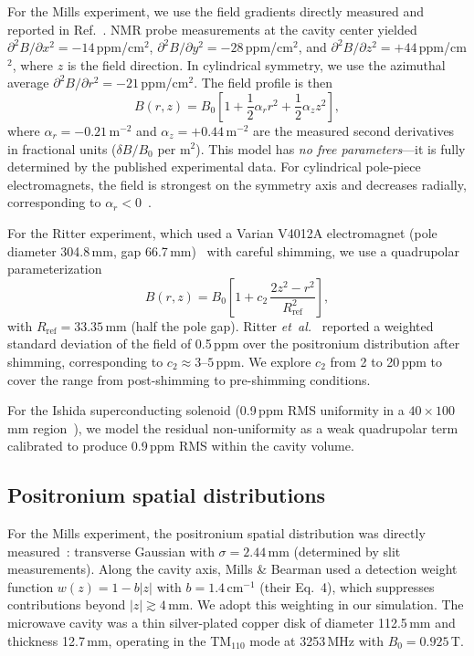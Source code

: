 \documentclass[twocolumn,pra,aps,superscriptaddress,floatfix,10pt]{revtex4-2}
\begin{document}
For the Mills experiment, we use the field gradients directly measured and reported in Ref.~\cite{Mills1975}. NMR probe measurements at the cavity center yielded $\partial^2 B/\partial x^2 = -14$\,ppm/cm$^2$, $\partial^2 B/\partial y^2 = -28$\,ppm/cm$^2$, and $\partial^2 B/\partial z^2 = +44$\,ppm/cm$^2$, where $z$ is the field direction. In cylindrical symmetry, we use the azimuthal average $\partial^2 B/\partial r^2 = -21$\,ppm/cm$^2$. The field profile is then
\begin{equation}
  B(r,z) = B_0\left[1 + \frac{1}{2}\alpha_r r^2 + \frac{1}{2}\alpha_z z^2\right],
  \label{eq:mills_field}
\end{equation}
where $\alpha_r = -0.21$\,m$^{-2}$ and $\alpha_z = +0.44$\,m$^{-2}$ are the measured second derivatives in fractional units ($\delta B / B_0$ per m$^2$). This model has \emph{no free parameters}---it is fully determined by the published experimental data. For cylindrical pole-piece electromagnets, the field is strongest on the symmetry axis and decreases radially, corresponding to $\alpha_r < 0$~\cite{Rich1981}.

For the Ritter experiment, which used a Varian V4012A electromagnet (pole diameter 304.8\,mm, gap 66.7\,mm)~\cite{Theriot1970,Ritter1984} with careful shimming, we use a quadrupolar parameterization
\begin{equation}
  B(r,z) = B_0\left[1 + c_2\,\frac{2z^2 - r^2}{R_\mathrm{ref}^2}\right],
  \label{eq:ritter_field}
\end{equation}
with $R_\mathrm{ref} = 33.35$\,mm (half the pole gap). Ritter \textit{et~al.}~\cite{Ritter1984} reported a weighted standard deviation of the field of 0.5\,ppm over the positronium distribution after shimming, corresponding to $c_2 \approx 3$--$5$\,ppm. We explore $c_2$ from 2 to 20\,ppm to cover the range from post-shimming to pre-shimming conditions.

For the Ishida superconducting solenoid (0.9\,ppm RMS uniformity in a $40 \times 100$\,mm region~\cite{Ishida2014}), we model the residual non-uniformity as a weak quadrupolar term calibrated to produce 0.9\,ppm RMS within the cavity volume.

\subsection{Positronium spatial distributions}
\label{sec:ps_dist}

For the Mills experiment, the positronium spatial distribution was directly measured~\cite{Mills1975}: transverse Gaussian with $\sigma = 2.44$\,mm (determined by slit measurements). Along the cavity axis, Mills \& Bearman used a detection weight function $w(z) = 1 - b|z|$ with $b = 1.4$\,cm$^{-1}$ (their Eq.~4), which suppresses contributions beyond $|z| \gtrsim 4$\,mm. We adopt this weighting in our simulation. The microwave cavity was a thin silver-plated copper disk of diameter 112.5\,mm and thickness 12.7\,mm, operating in the TM$_{110}$ mode at 3253\,MHz with $B_0 = 0.925$\,T.
\end{document}
